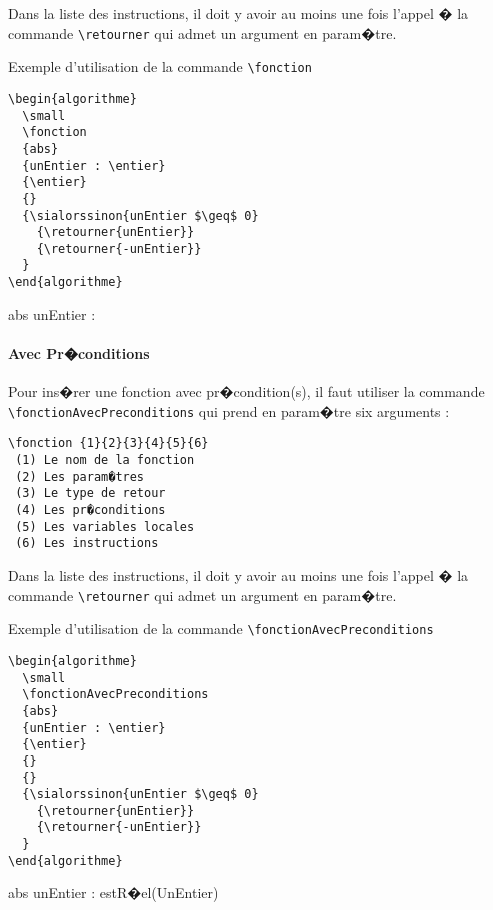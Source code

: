 \documentclass[a4paper,12pt]{report}
\begin{document}
Dans la liste des instructions, il doit y avoir au moins une fois
l'appel � la commande \texttt{\textbackslash retourner} qui admet un
argument en param�tre.

Exemple d'utilisation de la commande \texttt{\textbackslash fonction}

\begin{lstlisting}
\begin{algorithme}
  \small
  \fonction
  {abs}
  {unEntier : \entier}
  {\entier}
  {}
  {\sialorssinon{unEntier $\geq$ 0}
    {\retourner{unEntier}}
    {\retourner{-unEntier}}
  }    
\end{algorithme}
\end{lstlisting}


\begin{algorithme}
    \small
    \fonction
    {abs}
    {unEntier : \entier}
    {\entier}
    {}
    {
      {}
      {}
    }    
  \end{algorithme}

\paragraph{Avec Pr�conditions}
Pour ins�rer une fonction avec pr�condition(s), il faut utiliser la commande \texttt{\textbackslash fonctionAvecPreconditions}  qui prend en param�tre six arguments :
\begin{lstlisting}
\fonction {1}{2}{3}{4}{5}{6}
 (1) Le nom de la fonction 
 (2) Les param�tres 
 (3) Le type de retour
 (4) Les pr�conditions
 (5) Les variables locales
 (6) Les instructions
\end{lstlisting}

Dans la liste des instructions, il doit y avoir au moins une fois
l'appel � la commande \texttt{\textbackslash retourner} qui admet un
argument en param�tre.

Exemple d'utilisation de la commande \texttt{\textbackslash fonctionAvecPreconditions}

\begin{lstlisting}
\begin{algorithme}
  \small
  \fonctionAvecPreconditions
  {abs}
  {unEntier : \entier}
  {\entier}
  {}
  {}
  {\sialorssinon{unEntier $\geq$ 0}
    {\retourner{unEntier}}
    {\retourner{-unEntier}}
  }    
\end{algorithme}
\end{lstlisting}


\begin{algorithme}
    \small
    \fonctionAvecPreconditions
    {abs}
    {unEntier : \entier}
    {\entier}
    {estR�el(UnEntier)}
    {}
    {
      {}
      {}
    }    
  \end{algorithme}
\end{document}
